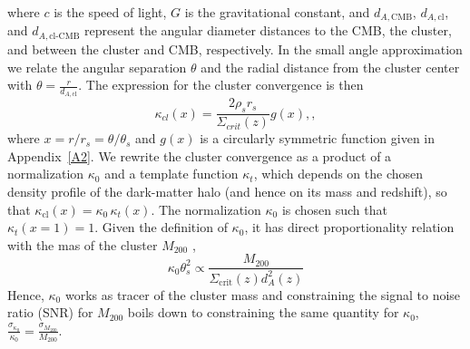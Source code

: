 \documentclass[prd, superscriptaddress, tightenlines, longbibliography, nofootinbib, eqsecnum, amsfonts, amsmath, floatfix, twocolumn, notitlepage]{revtex4-2}
\newcommand{\LL}[1]{{\color{orange}{LL: #1}}}
\newcommand{\bb}[1]{\textcolor{teal}{SS : #1}}
\begin{document}
where $c$ is the speed of light, $G$ is the gravitational constant, and $d_{A,\text{CMB}}$, $d_{A,\text{cl}}$, and $d_{A,\text{cl-CMB}}$ represent the angular diameter distances to the CMB, the cluster, and between the cluster and CMB, respectively. 
In the small angle approximation we relate the angular separation $\theta$ and the radial distance from the cluster center with $\theta = \frac{r}{d_{A,\text{cl}}}$.
The expression for the cluster convergence is then
\begin{equation}
    \kappa_{cl} (x) = \frac{2\rho_s r_s}{\Sigma_{crit}(z)}g(x), ,
\end{equation}
where  $x= r / r_s = \theta / \theta_s$ and $g(x)$ is a circularly symmetric function given in Appendix~\ref{A2}. 
We rewrite the cluster convergence as a product of a normalization $\kappa_0$ and a template function $\kappa_t$, which depends on the chosen density profile of the dark-matter halo (and hence on its mass and redshift), so that $\kappa_{\text{cl}} (x) = \kappa_0 \, \kappa_t (x)$. 
The normalization $\kappa_0$ is chosen such that $\kappa_t(x=1) = 1$.
Given the definition of $\kappa_0$, it has direct proportionality relation with the mas of the cluster $M_{200}$ \cite{Zubeldia:2019brr},
\begin{equation}\label{eq:tracer}
    \kappa_0 \theta_s^2 \propto \frac{M_{200}}{\Sigma_{\text{crit}}(z)d_{A}^2(z)}
\end{equation}
Hence, $\kappa_0$ works as tracer of the cluster mass and constraining the signal to noise ratio (SNR) for $M_{200}$ boils down to constraining the same quantity for $\kappa_0$, $\displaystyle \frac{\sigma_{\kappa_0}}{\kappa_0} = \frac{\sigma_{M_{200}}}{M_{200}}$. 
\end{document}
